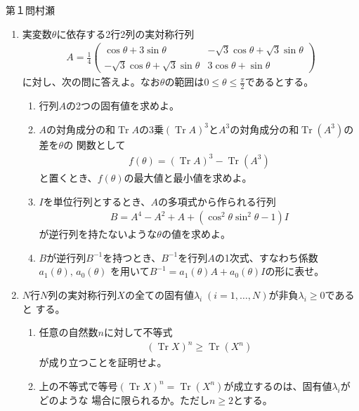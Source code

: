 \def\Tr{\mathop{\mathrm{Tr}}}
\begin{question}{第１問}{村瀬}
\begin{enumerate}
\item
  実変数$\theta$に依存する2行2列の実対称行列
  \begin{align*}
    A=\frac14\begin{pmatrix}
      \cos\theta + 3 \sin\theta & -\sqrt3 \cos\theta + \sqrt3 \sin\theta\\
      -\sqrt3\cos\theta+\sqrt3\sin\theta & 3\cos\theta + \sin\theta
    \end{pmatrix}
  \end{align*}
  に対し、次の問に答えよ。なお$\theta$の範囲は$0\le\theta\le\frac\pi2$であるとする。

  \begin{enumerate}
  \item
    行列$A$の2つの固有値を求めよ。
  \item
    $A$の対角成分の和$\Tr A$の3乗$(\Tr A)^3$と$A^3$の対角成分の和$\Tr(A^3)$の差を$\theta$の
    関数として
    \begin{align*}
      f(\theta) = (\Tr A)^3 - \Tr(A^3)
    \end{align*}
    と置くとき、$f(\theta)$の最大値と最小値を求めよ。
  \item
    $I$を単位行列とするとき、$A$の多項式から作られる行列
    \begin{align*}
      B = A^4 - A^2 + A + (\cos^2\theta \sin^2\theta -1) I
    \end{align*}
    が逆行列を持たないような$\theta$の値を求めよ。
  \item
    $B$が逆行列$B^{-1}$を持つとき、$B^{-1}$を行列$A$の1次式、すなわち係数$a_1(\theta),\,a_0(\theta)$
    を用いて$B^{-1}=a_1(\theta)A+a_0(\theta)I$の形に表せ。
  \end{enumerate}

\item
  $N$行$N$列の実対称行列$X$の全ての固有値$\lambda_i\;(i=1,\ldots,N)$が非負$\lambda_i\ge0$であると
  する。
  \begin{enumerate}
  \item
    任意の自然数$n$に対して不等式
    \begin{align*}
      (\Tr X)^n \ge \Tr(X^n)
    \end{align*}
    が成り立つことを証明せよ。
  \item
    上の不等式で等号$(\Tr X)^n=\Tr(X^n)$が成立するのは、固有値$\lambda_i$がどのような
    場合に限られるか。ただし$n\ge2$とする。
  \end{enumerate}

\end{enumerate}
\end{question}

